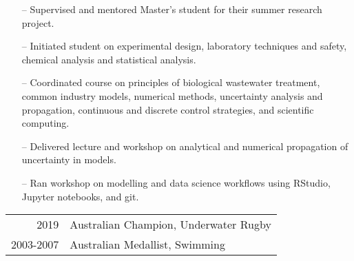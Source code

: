 \documentclass[10pt,a4paper]{altacv}
\begin{document}
\begin{itemize}
    \setlength{\itemindent}{0.3em}
    \item[--]   \small{Supervised and mentored Master's student for their summer research project.}
    \item[--]   \small{Initiated student on experimental design, laboratory techniques and safety, chemical analysis and statistical analysis.}
\end{itemize}
\divider\smallskip

\begin{itemize}
    \setlength{\itemindent}{0.3em}
    \item[--]   \small{Coordinated course on principles of biological wastewater treatment, 
    common industry models, numerical methods, 
    uncertainty analysis and propagation, 
    continuous and discrete control strategies, 
    and scientific computing.}
\end{itemize}
\divider\smallskip

\begin{itemize}
    \setlength{\itemindent}{0.3em}
    \item[--]   \small{Delivered lecture and workshop on analytical 
    and numerical propagation of uncertainty in models.}
    \item[--]   \small{Ran workshop on modelling and data science 
    workflows using RStudio, Jupyter notebooks, and git.}
\end{itemize}




\begin{tabular}{rl}
2019 & Australian Champion, Underwater Rugby \\
2003-2007 & Australian Medallist, Swimming\\
\end{tabular}







\end{document}
